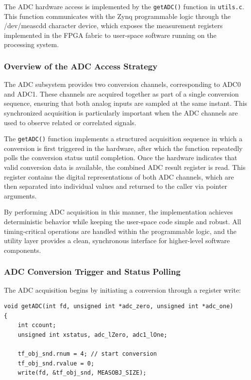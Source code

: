 The ADC hardware access is implemented by the \texttt{getADC()} function in \texttt{utils.c}. This function communicates with the Zynq programmable logic through the /dev/meascdd character device, which exposes the measurement registers implemented in the FPGA fabric to user-space software running on the processing system.

\subsubsection{Overview of the ADC Access Strategy}
The ADC subsystem provides two conversion channels, corresponding to ADC0 and ADC1. These channels are acquired together as part of a single conversion sequence, ensuring that both analog inputs are sampled at the same instant. This synchronized acquisition is particularly important when the ADC channels are used to observe related or correlated signals.

The \texttt{getADC()} function implements a structured acquisition sequence in which a conversion is first triggered in the hardware, after which the function repeatedly polls the conversion status until completion. Once the hardware indicates that valid conversion data is available, the combined ADC result register is read. This register contains the digital representations of both ADC channels, which are then separated into individual values and returned to the caller via pointer arguments.

By performing ADC acquisition in this manner, the implementation achieves deterministic behavior while keeping the user-space code simple and robust. All timing-critical operations are handled within the programmable logic, and the utility layer provides a clean, synchronous interface for higher-level software components.

\subsubsection{ADC Conversion Trigger and Status Polling}
The ADC acquisition begins by initiating a conversion through a register write:

\begin{verbatim}
void getADC(int fd, unsigned int *adc_zero, unsigned int *adc_one)
{
    int ccount;
    unsigned int xstatus, adc_lZero, adc1_lOne;

    tf_obj_snd.rnum = 4; // start conversion
    tf_obj_snd.rvalue = 0;
    write(fd, &tf_obj_snd, MEASOBJ_SIZE);
\end{verbatim}


